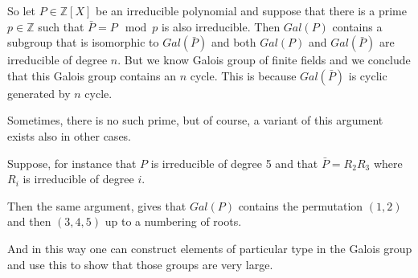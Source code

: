 So let $P \in \mathbb{Z}\left[X\right]$ be an
irreducible polynomial and suppose that there is a prime
$p \in \mathbb{Z}$ such that $\bar{P} = P \mod p$ is also irreducible.
Then $Gal\left(P\right)$ contains a subgroup that is isomorphic to 
$Gal\left(\bar{P}\right)$ and both
$Gal\left(P\right)$ and $Gal\left(\bar{P}\right)$ are
irreducible of degree $n$. But we know Galois group of finite fields
and we conclude that this Galois group contains an $n$ cycle.
This is because $Gal\left(\bar{P}\right)$ is cyclic generated by $n$ cycle.

Sometimes, there is no such prime, but of course, a variant of this
argument exists also in other cases.

Suppose, for instance that $P$ is irreducible of degree 5 and that
$\bar{P} = R_2 R_3$ where $R_i$ is irreducible of degree $i$.


Then the same argument, gives that
$Gal\left(P\right)$ contains the permutation $(1,2)$ and then
$(3,4,5)$ up to a numbering of roots.

And in this way one can construct elements of particular type in the
Galois group and use this to show that those groups are very large.  
